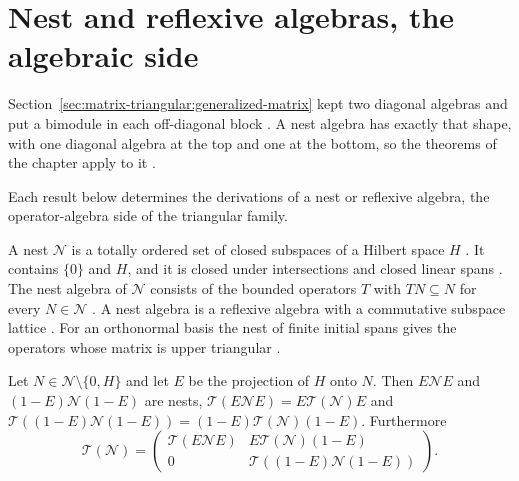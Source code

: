 \section{Nest and reflexive algebras, the algebraic side}\label{sec:matrix-triangular:nest-algebraic}

Section~\ref{sec:matrix-triangular:generalized-matrix} kept two diagonal algebras
and put a bimodule in each off-diagonal block
\cite[p.~2720]{DuWang2012}. A nest algebra has exactly that shape, with one
diagonal algebra at the top and one at the bottom, so the theorems of the chapter
apply to it \cite[Proposition~19, p.~308]{Cheung2003}.

Each result below determines the derivations of a nest or reflexive algebra, the operator-algebra side of the triangular family.

A nest $\mathcal{N}$ is a totally ordered set of closed subspaces of a Hilbert
space $H$ \cite[p.~308]{Cheung2003}. It contains $\{0\}$ and $H$, and it is
closed under intersections and closed linear spans \cite[p.~308]{Cheung2003}.
The nest algebra of $\mathcal{N}$ consists of the bounded operators $T$ with
$TN\subseteq N$ for every $N\in\mathcal{N}$ \cite[p.~308]{Cheung2003}. A nest
algebra is a reflexive algebra with a commutative subspace lattice
\cite[p.~156]{Christensen1977}. For an orthonormal basis the nest of finite
initial spans gives the operators whose matrix is upper triangular
\cite[p.~308]{Cheung2003}.

\begin{proposition}\label{prop:nest:triangular}
Let $N\in\mathcal{N}\setminus\{0,H\}$ and let $E$ be the projection of $H$
onto $N$. Then $E\mathcal{N}E$ and $(1-E)\mathcal{N}(1-E)$ are nests,
$\mathcal{T}(E\mathcal{N}E)=E\mathcal{T}(\mathcal{N})E$ and
$\mathcal{T}((1-E)\mathcal{N}(1-E))=(1-E)\mathcal{T}(\mathcal{N})(1-E)$.
Furthermore
\[
\mathcal{T}(\mathcal{N})=
\begin{pmatrix}
\mathcal{T}(E\mathcal{N}E) & E\mathcal{T}(\mathcal{N})(1-E)\\
0 & \mathcal{T}((1-E)\mathcal{N}(1-E))
\end{pmatrix}.
\]
\end{proposition}

